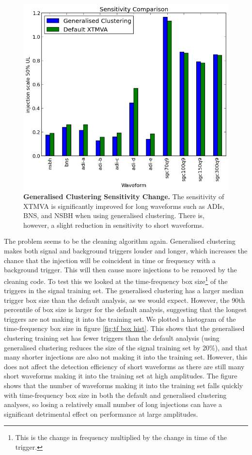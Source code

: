 \documentclass[11pt]{cuthesis}
\begin{document}
\begin{figure} %
\begin{center}
\includegraphics[width=0.8\linewidth]{gc_sensitivity_comparison.png}
\end{center}
\caption{\textbf{Generalised Clustering Sensitivity Change.} The sensitivity of XTMVA is significantly improved for long waveforms such as ADIs, BNS, and NSBH when using generalised clustering. There is, however, a slight reduction in sensitivity to short waveforms. }
\label{fig:gc sensitivity}
\end{figure}

The problem seems to be the cleaning algorithm again. Generalised clustering makes both signal and background triggers louder and longer, which increases the chance that the injection will be coincident in time or frequency with a background trigger. This will then cause more injections to be removed by the cleaning code. To test this we looked at the time-frequency box size\footnote{This is the change in frequency multiplied by the change in time of the trigger.} of the triggers in the signal training set. The generalised clustering has a larger median trigger box size than the default analysis, as we would expect. However, the 90th percentile of box size is larger for the default analysis, suggesting that the longest triggers are not making it into the training set. We plotted a histogram of the time-frequency box size in figure \ref{fig:tf box hist}. This shows that the generalised clustering training set has fewer triggers than the default analysis (using generalised clustering reduces the size of the signal training set by 20\%), and that many shorter injections are also not making it into the training set.  However, this does not affect the detection efficiency of short waveforms as there are still many short waveforms making it into the training set at high amplitudes. The figure shows that the number of waveforms making it into the training set falls quickly with time-frequency box size in both the default and generalised clustering analyses, so losing a relatively small number of long injections can have a significant detrimental effect on performance at large amplitudes.
\end{document}
